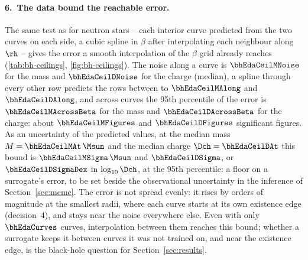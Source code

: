 \FloatBarrier

\paragraph{6.\ The data bound the reachable error.}
The same test as for neutron stars -- each interior curve predicted from the two curves on each side, a cubic spline in $\beta$ after interpolating each neighbour along $\rh$ -- gives the error a smooth interpolation of the $\beta$ grid already reaches (\cref{tab:bh-ceilings}, \cref{fig:bh-ceilings}). The noise along a curve is $\bhEdaCeilMNoise$ for the mass and $\bhEdaCeilDNoise$ for the charge (median), a spline through every other row predicts the rows between to $\bhEdaCeilMAlong$ and $\bhEdaCeilDAlong$, and across curves the 95th percentile of the error is $\bhEdaCeilMAcrossBeta$ for the mass and $\bhEdaCeilDAcrossBeta$ for the charge: about $\bhEdaCeilMFigures$ and $\bhEdaCeilDFigures$ significant figures. As an uncertainty of the predicted values, at the median mass $M = \bhEdaCeilMAt\,\Msun$ and the median charge $\Dch = \bhEdaCeilDAt$ this bound is $\bhEdaCeilMSigma\,\Msun$ and $\bhEdaCeilDSigma$, or $\bhEdaCeilDSigmaDex$ in $\log_{10}\Dch$, at the 95th percentile: a floor on a surrogate's error, to be set beside the observational uncertainty in the inference of Section~\ref{sec:mcmc}. The error is not spread evenly: it rises by orders of magnitude at the smallest radii, where each curve starts at its own existence edge (decision~4), and stays near the noise everywhere else. Even with only $\bhEdaCurves$ curves, interpolation between them reaches this bound; whether a surrogate keeps it between curves it was not trained on, and near the existence edge, is the black-hole question for Section~\ref{sec:results}.

\FloatBarrier
